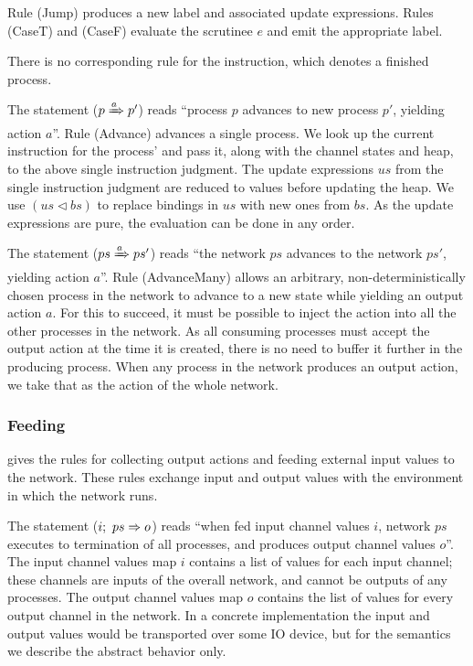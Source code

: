 Rule (Jump) produces a new label and associated update expressions. Rules (CaseT) and (CaseF) evaluate the scrutinee $e$ and emit the appropriate label.

There is no corresponding rule for the \lstiproc@exit@ instruction, which denotes a finished process.

The statement ($p \xRightarrow{a} p'$) reads ``process $p$ advances to new process $p'$, yielding action $a$''. Rule (Advance) advances a single process. We look up the current instruction for the process' \lstiproc@label@ and pass it, along with the channel states and heap, to the above single instruction judgment. The update expressions $us$ from the single instruction judgment are reduced to values before updating the heap. We use $(us \lhd bs)$ to replace bindings in $us$ with new ones from $bs$. As the update expressions are pure, the evaluation can be done in any order.

The statement ($ps \xRightarrow{a} ps'$) reads ``the network $ps$ advances to the network $ps'$, yielding action $a$''.
Rule (AdvanceMany) allows an arbitrary, non-deterministically chosen process in the network to advance to a new state while yielding an output action $a$.
For this to succeed, it must be possible to inject the action into all the other processes in the network.
As all consuming processes must accept the output action at the time it is created, there is no need to buffer it further in the producing process.
When any process in the network produces an output action, we take that as the action of the whole network.

\subsubsection{Feeding}
 gives the rules for collecting output actions and feeding external input values to the network.
These rules exchange input and output values with the environment in which the network runs.




The statement ($i;~ps \Rightarrow o$) reads ``when fed input channel values $i$, network $ps$ executes to termination of all processes, and produces output channel values $o$''.
The input channel values map $i$ contains a list of values for each input channel; these channels are inputs of the overall network, and cannot be outputs of any processes.
The output channel values map $o$ contains the list of values for every output channel in the network.
In a concrete implementation the input and output values would be transported over some IO device, but for the semantics we describe the abstract behavior only.

